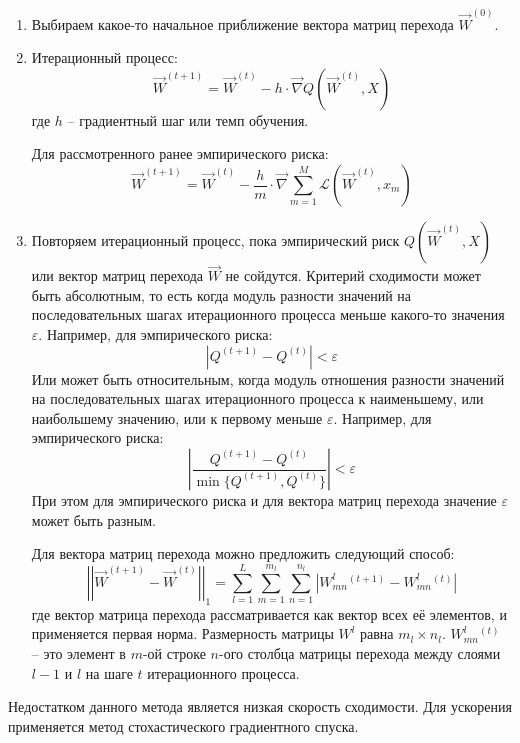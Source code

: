 \begin{enumerate}
	\item Выбираем какое-то начальное приближение вектора матриц перехода $\overrightarrow{W}^{(0)}$.

	\item Итерационный процесс:
	      $$
		      \overrightarrow{W}^{(t+1)} = \overrightarrow{W}^{(t)} - h \cdot \overrightarrow{\nabla} Q(\overrightarrow{W}^{(t)}, X)
	      $$
	      где $h$ -- градиентный шаг или темп обучения.

	      Для рассмотренного ранее эмпирического риска:
	      $$
		      \overrightarrow{W}^{(t+1)} = \overrightarrow{W}^{(t)} - \frac{h}{m} \cdot \overrightarrow{\nabla} \sum\limits_{m = 1}^{M} \mathcal{L} (\overrightarrow{W}^{(t)}, x_m)
	      $$

	\item Повторяем итерационный процесс, пока эмпирический риск $Q(\overrightarrow{W}^{(t)}, X)$ или вектор матриц перехода $\overrightarrow{W}$ не сойдутся. Критерий сходимости может быть абсолютным, то есть когда модуль разности значений на последовательных шагах итерационного процесса меньше какого-то значения $\varepsilon$. Например, для эмпирического риска:
	      $$
		      \left| Q^{(t + 1)} - Q^{(t)} \right| < \varepsilon
	      $$
	      Или может быть относительным, когда модуль отношения разности значений на последовательных шагах итерационного процесса к наименьшему, или наибольшему значению, или к первому меньше $\varepsilon$. Например, для эмпирического риска:
	      $$
		      \left| \frac{Q^{(t + 1)} - Q^{(t)}}{\min \{ Q^{(t + 1)}, Q^{(t)} \} } \right| < \varepsilon
	      $$
	      При этом для эмпирического риска и для вектора матриц перехода значение $\varepsilon$ может быть разным.

	      Для вектора матриц перехода можно предложить следующий способ:
	      $$
		      \left|\left| \overrightarrow{W}^{(t+1)} - \overrightarrow{W}^{(t)} \right|\right|_1 = \sum\limits_{l = 1}^{L} \sum\limits_{m = 1}^{m_l} \sum\limits_{n = 1}^{n_l} |W^l_{mn}{}^{(t+1)} - W^l_{mn}{}^{(t)}|
	      $$
	      где вектор матрица перехода рассматривается как вектор всех её элементов, и применяется первая норма. Размерность матрицы $W^l$ равна $m_l \times n_l$. $W^l_{mn}{}^{(t)}$ -- это элемент в $m$-ой строке $n$-ого столбца матрицы перехода между слоями $l-1$ и $l$ на шаге $t$ итерационного процесса.
\end{enumerate}

Недостатком данного метода является низкая скорость сходимости. Для ускорения применяется метод стохастического градиентного спуска.

